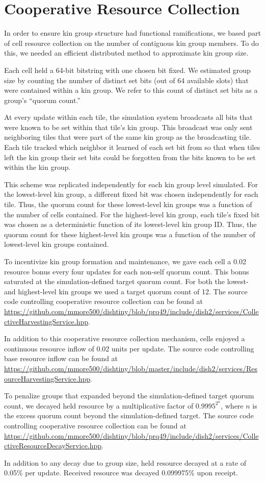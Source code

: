 \section{Cooperative Resource Collection}

In order to ensure kin group structure had functional ramifications, we based part of cell resource collection on the number of contiguous kin group members.
To do this, we needed an efficient distributed method to approximate kin group size.

Each cell held a 64-bit bitstring with one chosen bit fixed.
We estimated group size by counting the number of distinct set bits (out of 64 available slots) that were contained within a kin group.
We refer to this count of distinct set bits as a group's ``quorum count.''

At every update within each tile, the simulation system broadcasts all bits that were known to be set within that tile's kin group.
This broadcast was only sent neighboring tiles that were part of the same kin group as the broadcasting tile.
Each tile tracked which neighbor it learned of each set bit from so that when tiles left the kin group their set bits could be forgotten from the bits known to be set within the kin group.

This scheme was replicated independently for each kin group level simulated.
For the lowest-level kin group, a different fixed bit was chosen independently for each tile.
Thus, the quorum count for these lowest-level kin groups was a function of the number of cells contained.
For the highest-level kin group, each tile's fixed bit was chosen as a deterministic function of its lowest-level kin group ID.
Thus, the quorum count for these highest-level kin groups was a function of the number of lowest-level kin groups contained.

To incentivize kin group formation and maintenance, we gave each cell a 0.02 resource bonus every four updates for each non-self quorum count.
This bonus saturated at the simulation-defined target quorum count.
For both the lowest- and highest-level kin groups we used a target quorum count of 12.
The source code controlling cooperative resource collection can be found at \url{https://github.com/mmore500/dishtiny/blob/prq49/include/dish2/services/CollectiveHarvestingService.hpp}.

In addition to this cooperative resource collection mechanism, cells enjoyed a continuous resource inflow of 0.02 units per update.
The source code controlling base resource inflow can be found at \url{https://github.com/mmore500/dishtiny/blob/master/include/dish2/services/ResourceHarvestingService.hpp}.

To penalize groups that expanded beyond the simulation-defined target quorum count, we decayed held resource by a multiplicative factor of $0.9995^{2^n}$, where $n$ is the excess quorum count beyond the simulation-defined target.
The source code controlling cooperative resource collection can be found at \url{https://github.com/mmore500/dishtiny/blob/prq49/include/dish2/services/CollectiveResourceDecayService.hpp}.

In addition to any decay due to group size, held resource decayed at a rate of 0.05\% per update.
Received resource was decayed 0.099975\% upon receipt.
